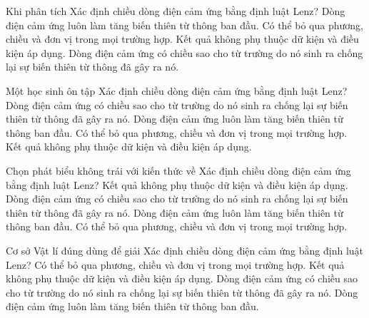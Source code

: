 \begin{ex}
Khi phân tích Xác định chiều dòng điện cảm ứng bằng định luật Lenz?
\choice
{Dòng điện cảm ứng luôn làm tăng biến thiên từ thông ban đầu.}
{Có thể bỏ qua phương, chiều và đơn vị trong mọi trường hợp.}
{Kết quả không phụ thuộc dữ kiện và điều kiện áp dụng.}
{\True Dòng điện cảm ứng có chiều sao cho từ trường do nó sinh ra chống lại sự biến thiên từ thông đã gây ra nó.}
\end{ex}

\begin{ex}
Một học sinh ôn tập Xác định chiều dòng điện cảm ứng bằng định luật Lenz?
\choice
{\True Dòng điện cảm ứng có chiều sao cho từ trường do nó sinh ra chống lại sự biến thiên từ thông đã gây ra nó.}
{Dòng điện cảm ứng luôn làm tăng biến thiên từ thông ban đầu.}
{Có thể bỏ qua phương, chiều và đơn vị trong mọi trường hợp.}
{Kết quả không phụ thuộc dữ kiện và điều kiện áp dụng.}
\end{ex}

\begin{ex}
Chọn phát biểu không trái với kiến thức về Xác định chiều dòng điện cảm ứng bằng định luật Lenz?
\choice
{Kết quả không phụ thuộc dữ kiện và điều kiện áp dụng.}
{\True Dòng điện cảm ứng có chiều sao cho từ trường do nó sinh ra chống lại sự biến thiên từ thông đã gây ra nó.}
{Dòng điện cảm ứng luôn làm tăng biến thiên từ thông ban đầu.}
{Có thể bỏ qua phương, chiều và đơn vị trong mọi trường hợp.}
\end{ex}

\begin{ex}
Cơ sở Vật lí đúng dùng để giải Xác định chiều dòng điện cảm ứng bằng định luật Lenz?
\choice
{Có thể bỏ qua phương, chiều và đơn vị trong mọi trường hợp.}
{Kết quả không phụ thuộc dữ kiện và điều kiện áp dụng.}
{\True Dòng điện cảm ứng có chiều sao cho từ trường do nó sinh ra chống lại sự biến thiên từ thông đã gây ra nó.}
{Dòng điện cảm ứng luôn làm tăng biến thiên từ thông ban đầu.}
\end{ex}

